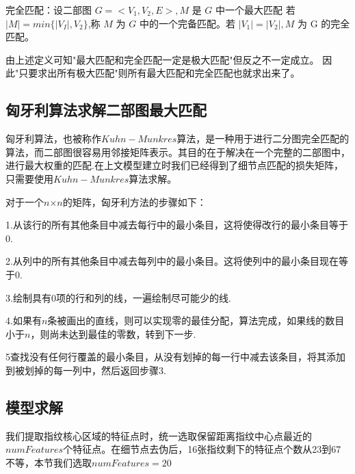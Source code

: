 \documentclass[withoutpreface,bwprint]{cumcmthesis} %
\begin{document}
\begin{definition}
	完全匹配：设二部图 $G=<V_{1}, V_{2}, E>, M$ 是 $G$ 中一个最大匹配 若$|M|=min\{|V_I|, V_{2} \}$,称 $M$ 为 $G$ 中的一个完备匹配。若 $\left| V _{1}\right|=\left| V _{2}\right|, M$ 为 G 的完全匹配。
\end{definition}

由上述定义可知"最大匹配和完全匹配一定是极大匹配"但反之不一定成立。 因此"只要求出所有极大匹配"则所有最大匹配和完全匹配也就求出来了。

\subsection{匈牙利算法求解二部图最大匹配}
  匈牙利算法，也被称作$Kuhn-Munkres$算法，是一种用于进行二分图完全匹配的算法，而二部图很容易用邻接矩阵表示\cite{李昌华2017图谱和}。其目的在于解决在一个完整的二部图中，进行最大权重的匹配.在上文模型建立时我们已经得到了细节点匹配的损失矩阵，只需要使用$Kuhn-Munkres$算法求解。

  对于一个$n$×$n$的矩阵，匈牙利方法的步骤如下：

  1.从该行的所有其他条目中减去每行中的最小条目，这将使得改行的最小条目等于0.\par
  2.从列中的所有其他条目中减去每列中的最小条目。这将使列中的最小条目现在等于0.\par
  3.绘制具有0项的行和列的线，一遍绘制尽可能少的线.\par
  4.如果有$n$条被画出的直线，则可以实现零的最佳分配，算法完成，如果线的数目小于$n$，则尚未达到最佳的零数，转到下一步.\par
  5查找没有任何行覆盖的最小条目，从没有划掉的每一行中减去该条目，将其添加到被划掉的每一列中，然后返回步骤3.\par

\subsection{模型求解}
我们提取指纹核心区域的特征点时，统一选取保留距离指纹中心点最近的$numFeatures$个特征点。在细节点去伪后，16张指纹剩下的特征点个数从23到67不等，本节我们选取$numFeatures=20$
\end{document}
